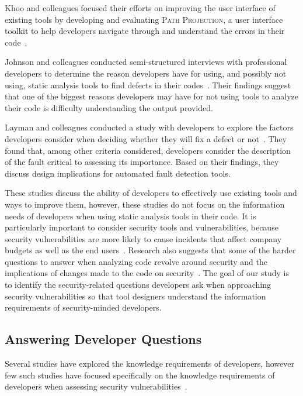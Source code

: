 \documentclass[conference]{IEEEtran}
\begin{document}
Khoo and colleagues focused their efforts on improving the user interface of existing tools by developing and evaluating \textsc{Path Projection}, a user interface toolkit to help developers navigate through and understand the errors in their code~\cite{khoo2008path}.

Johnson and colleagues conducted semi-structured interviews with professional developers to determine the reason developers have for using, and possibly not using, static analysis tools to find defects in their codes~\cite{johnson2013don}. 
Their findings suggest that one of the biggest reasons developers may have for not using tools to analyze their code is difficulty understanding the output provided. 

Layman and colleagues conducted a study with developers to explore the factors developers consider when deciding whether they will fix a defect or not~\cite{layman2007toward}. 
They found that, among other criteria considered, developers consider the description of the fault critical to assessing its importance. 
Based on their findings, they discuss design implications for automated fault detection tools.

These studies discuss the ability of developers to effectively use existing tools and ways to improve them, however, these studies do not focus on the information needs of developers when using static analysis tools in their code.
It is particularly important to consider security tools and vulnerabilities, because security vulnerabilities are more likely to cause incidents that affect company budgets as well as the end users~\cite{chen2002mops}. 
Research also suggests that some of the harder questions to answer when analyzing code revolve around security and the implications of changes made to the code on security~\cite{latoza2010hard}.  
The goal of our study is to identify the security-related questions developers ask when approaching security vulnerabilities so that tool designers understand the information requirements of security-minded developers.

\subsection{Answering Developer Questions}
\label{questions}
Several studies have explored the knowledge requirements of developers, however few such studies have focused specifically on the knowledge requirements of developers when assessing security vulnerabilities~\cite{begel2014analyze, latoza2010hard, latoza2010developers}.
\end{document}
